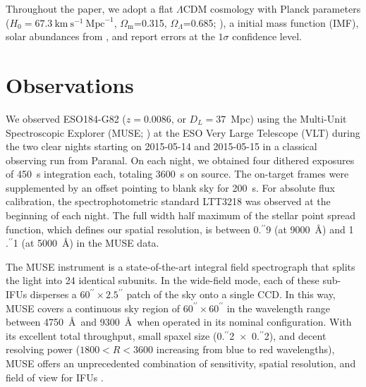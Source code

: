 \documentclass[traditabstract]{aa}
\newcommand{\farc}{\hbox{$.\!\!^{\prime\prime}$}}
\begin{document}
Throughout the paper, we adopt a flat $\Lambda$CDM cosmology with Planck parameters ($H_0=67.3~\mathrm{km}~\mathrm{s}^{-1}~\mathrm{Mpc}^{-1}$, $\Omega_\mathrm{m}$=0.315, $\Omega_\Lambda$=0.685; \citealt{2014A&A...571A..16P}), a \citet{2003PASP..115..763C} initial mass function (IMF), solar abundances from \citet{2009ARA&A..47..481A}, and report errors at the $1\sigma$ confidence level.

\section{Observations}

We observed ESO184-G82 ($z=0.0086$, or $D_L=37$~Mpc) using the Multi-Unit Spectroscopic Explorer (MUSE; \citealp{2010SPIE.7735E..08B}) at the ESO Very Large Telescope (VLT) during the two clear nights starting on 2015-05-14 and 2015-05-15 in a classical observing run from Paranal. On each night, we obtained four dithered exposures of 450~s integration each, totaling 3600~s on source. The on-target frames were supplemented by an offset pointing to blank sky for 200~s. For absolute flux calibration, the spectrophotometric standard LTT3218 was observed at the beginning of each night. The full width half maximum of the stellar point spread function, which defines our spatial resolution, is between 0\farc{9} (at 9000~\AA) and 1\farc{1} (at 5000~\AA) in the MUSE data.

The MUSE instrument is a state-of-the-art integral field spectrograph that splits the light into 24 identical subunits. In the wide-field mode, each of these sub-IFUs disperses a $60^{\prime\prime}\times 2.5^{\prime\prime}$ patch of the sky onto a single CCD. In this way, MUSE covers a continuous sky region of $60^{\prime\prime}\times 60^{\prime\prime}$ in the wavelength range between 4750~\AA~and 9300~\AA~when operated in its nominal configuration. With its excellent total throughput, small spaxel size (0\farc{2}~$\times$~0\farc{2}), and decent resolving power ($1800 < R < 3600$ increasing from blue to red wavelengths), MUSE offers an unprecedented combination of sensitivity, spatial resolution, and field of view for IFUs \citep{2010SPIE.7735E..08B}.
\end{document}

